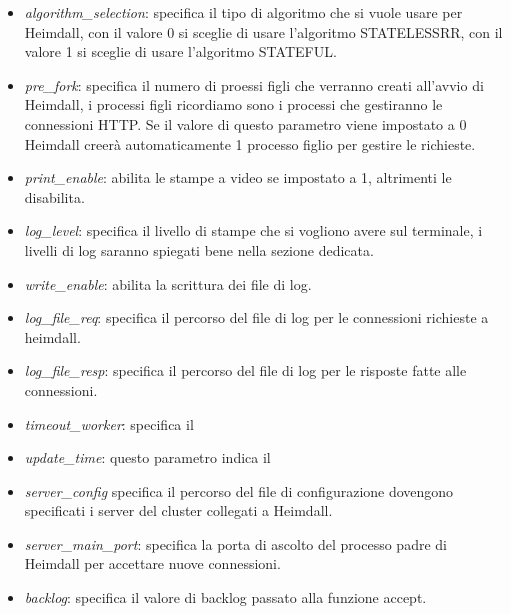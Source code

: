 \documentclass[italian]{tktltiki2}
\begin{document}
\begin{itemize}
  
  \item \emph{algorithm\_selection}: specifica il tipo di algoritmo che si vuole usare per Heimdall, con il valore 0 si sceglie di usare l'algoritmo STATELESSRR, con il valore 1 si sceglie di usare l'algoritmo STATEFUL.
  
  \item \emph{pre\_fork}: specifica il numero di proessi figli che verranno creati all'avvio di Heimdall, i processi figli ricordiamo sono i processi che gestiranno le connessioni HTTP. Se il valore di questo parametro viene impostato a 0 Heimdall creerà automaticamente 1 processo figlio per gestire le richieste.
  
  \item \emph{print\_enable}: abilita le stampe a video se impostato a 1, altrimenti le disabilita.
    
  \item \emph{log\_level}: specifica il livello di stampe che si vogliono avere sul terminale, i livelli di log saranno spiegati bene nella sezione dedicata.
  
  \item \emph{write\_enable}: abilita la scrittura dei file di log.
   
  \item \emph{log\_file\_req}: specifica il percorso del file di log per le connessioni richieste a heimdall.
    
  \item \emph{log\_file\_resp}: specifica il percorso del file di log per le risposte fatte alle connessioni.
    
  \item \emph{timeout\_worker}: specifica il  
  \item \emph{update\_time}: questo parametro indica il
  
  \item \emph{server\_config} specifica il percorso del file di configurazione dovengono specificati i server del cluster collegati a Heimdall.
  
  \item \emph{server\_main\_port}: specifica la porta di ascolto del processo padre di Heimdall per accettare nuove connessioni.
      
  \item \emph{backlog}: specifica il valore di backlog passato alla funzione accept.
  

\end{itemize}
\end{document}
